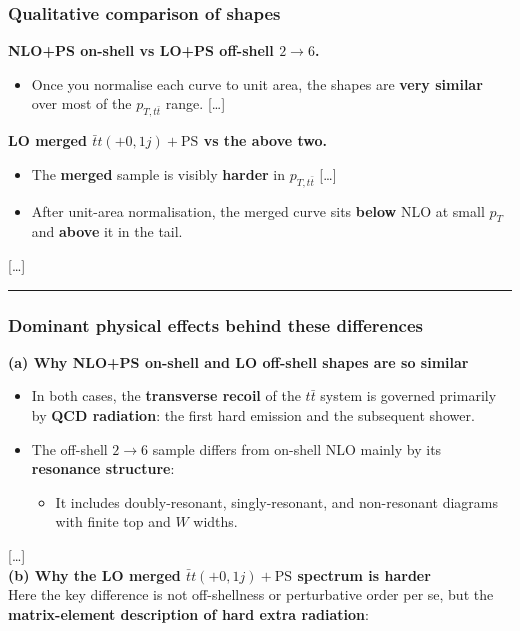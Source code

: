 \documentclass[submission, Phys]{SciPost}
\begin{document}
\begin{promptblock}
\subsubsection*{Qualitative comparison of shapes}

\textbf{NLO+PS on-shell vs LO+PS off-shell $2\to6$.}
\begin{itemize}
  \item Once you normalise each curve to unit area, the shapes are \textbf{very similar} over most of the $p_{T,t\bar t}$ range. [\ldots]
\end{itemize}

\textbf{LO merged $\bar t t(+0,1j)+\mathrm{PS}$ vs the above two.}
\begin{itemize}
  \item The \textbf{merged} sample is visibly \textbf{harder} in $p_{T,t\bar t}$
  [\ldots]
  \item After unit-area normalisation, the merged curve sits \textbf{below} NLO at small $p_T$ and \textbf{above} it in the tail.
\end{itemize}
[\ldots]
\vspace{1em}
\hrule

\subsubsection*{Dominant physical effects behind these differences}
\textbf{(a) Why NLO+PS on-shell and LO off-shell shapes are so similar}

\begin{itemize}
  \item In both cases, the \textbf{transverse recoil} of the $t\bar t$ system is governed primarily by \textbf{QCD radiation}: the first hard emission and the subsequent shower.
  \item The off-shell $2\to6$ sample differs from on-shell NLO mainly by its \textbf{resonance structure}:
  \begin{itemize}
    \item It includes doubly-resonant, singly-resonant, and non-resonant diagrams with finite top and $W$ widths.
  \end{itemize}
\end{itemize}
[\ldots]\\
\textbf{(b) Why the LO merged $\bar t t(+0,1j)+\mathrm{PS}$ spectrum is harder}\\
Here the key difference is not off-shellness or perturbative order per se, but the \textbf{matrix-element description of hard extra radiation}:


\end{promptblock}
\end{document}
